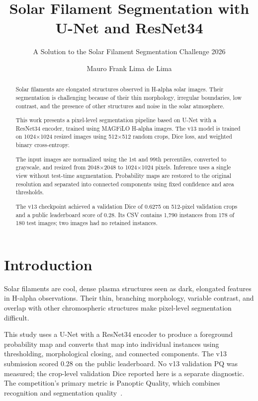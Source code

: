 \documentclass[sigconf,nonacm]{acmart}
\begin{document}
\title{Solar Filament Segmentation with U-Net and ResNet34}
\subtitle{A Solution to the Solar Filament Segmentation Challenge 2026}

\author{Mauro Frank Lima de Lima}

\begin{abstract}
Solar filaments are elongated structures observed in H-alpha solar
images. Their segmentation is challenging because of their thin
morphology, irregular boundaries, low contrast, and the presence of
other structures and noise in the solar atmosphere.

This work presents a pixel-level segmentation pipeline based on
U-Net with a ResNet34 encoder, trained using MAGFiLO H-alpha images.
The v13 model is trained on 1024$\times$1024 resized images using
512$\times$512 random crops, Dice loss, and weighted binary
cross-entropy.

The input images are normalized using the 1st and 99th percentiles,
converted to grayscale, and resized from 2048$\times$2048 to
1024$\times$1024 pixels. Inference uses a single view without
test-time augmentation. Probability maps are restored to the
original resolution and separated into connected components using
fixed confidence and area thresholds.

The v13 checkpoint achieved a validation Dice of 0.6275 on
512-pixel validation crops and a public leaderboard score of
0.28. Its CSV contains 1,790 instances from 178 of 180 test images;
two images had no retained instances.
\end{abstract}


\maketitle

\section{Introduction}

Solar filaments are cool, dense plasma structures seen as dark,
elongated features in H-alpha observations. Their thin, branching
morphology, variable contrast, and overlap with other chromospheric
structures make pixel-level segmentation difficult.

This study uses a U-Net with a ResNet34 encoder to produce a
foreground probability map and converts that map into individual
instances using thresholding, morphological closing, and
connected components. The v13 submission scored 0.28 on the public
leaderboard. No v13 validation PQ was measured; the crop-level
validation Dice reported here is a separate diagnostic.
The competition's primary metric is Panoptic Quality, which combines
recognition and segmentation quality~\cite{pq}.
\end{document}
